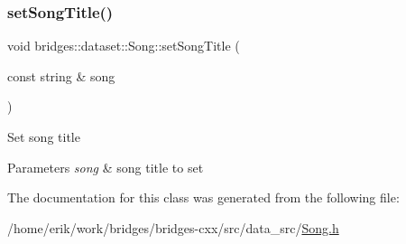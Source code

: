 \subsubsection{\texorpdfstring{set\+Song\+Title()}{setSongTitle()}}
{\footnotesize\ttfamily void bridges\+::dataset\+::\+Song\+::set\+Song\+Title (\begin{DoxyParamCaption}\item[{const string \&}]{song }\end{DoxyParamCaption})\hspace{0.3cm}{\ttfamily [inline]}}

Set song title 
\begin{DoxyParams}{Parameters}
{\em song} & song title to set \\
\hline
\end{DoxyParams}


The documentation for this class was generated from the following file\+:\begin{DoxyCompactItemize}
\item 
/home/erik/work/bridges/bridges-\/cxx/src/data\+\_\+src/\hyperlink{_song_8h}{Song.\+h}\end{DoxyCompactItemize}

